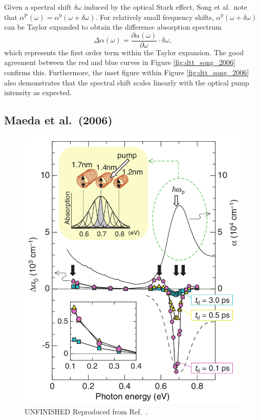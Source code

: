 Given a spectral shift $\delta \omega$ induced by the optical Stark effect, Song et al.\ note that $\alpha^\text{P}(\omega) = \alpha^0 (\omega + \delta \omega)$. For relatively small frequency shifts, $\alpha^0 (\omega + \delta \omega)$ can be Taylor expanded to obtain the difference absorption spectrum
\begin{equation}
	\Delta \alpha(\omega) = \frac{\partial \alpha(\omega)}{\partial \omega} \cdot \delta\omega,
\end{equation}
which represents the first order term within the Taylor expansion. The good agreement between the red and blue curves in Figure \ref{fig:dtt_song_2006} confirms this. Furthermore, the inset figure within Figure \ref{fig:dtt_song_2006} also demonstrates that the spectral shift scales linearly with the optical pump intensity as expected. 

\subsection{Maeda et al.\ (2006)}

\begin{figure}[ht]
	\centering
	\includegraphics[scale=0.4]{images/chapter_prior_works/stark_shift_maeda}
	\caption{{\color{red} UNFINISHED} Reproduced from Ref.\ \cite{maeda2006gigantic}.}
\end{figure}

